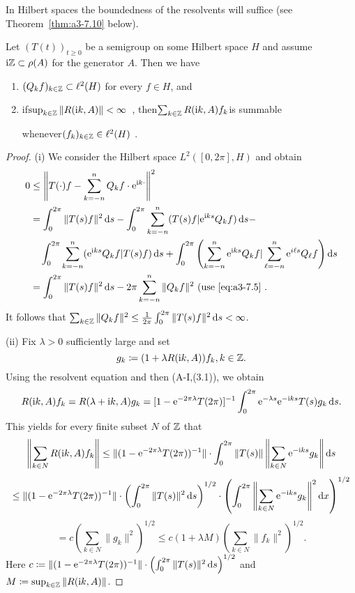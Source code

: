 In Hilbert spaces the boundedness of the resolvents will suffice (see Theorem~\ref{thm:a3-7.10} below).
\begin{lemma}\label{lem:a3-7.9}
Let $(T(t))_{t\geq 0}$ be a semigroup on some Hilbert space $H$ and assume $\mathrm{i}\mathbb{Z} \subset \rho(A)$ for the generator $A$.
Then we have
\begin{enumerate}[\upshape (i)]
\item 
$(Q_{k}f)_{k\in\mathbb{Z}} \subset \ell^{2}(H)$ for every $f \in H$, and

\item 
if\quad $\sup_{k\in\mathbb{Z}}\|R(\mathrm{i} k,A)\| < \infty$~, then\quad $\sum_{k\in\mathbb{Z}} R(\mathrm{i} k,A)f_{k}$\quad is summable 

whenever\quad $(f_{k})_{k\in\mathbb{Z}} \in \ell^{2}(H)$ .
\end{enumerate}
\end{lemma}
\begin{proof}
(i) We consider the Hilbert space $L^{2}([0,2\pi],H)$ and obtain
\begin{align*}
0 &\leq \left\|T(\cdot)f - \sum_{k=-n}^{n} Q_{k}f\cdot \mathrm{e}^{\mathrm{i} k\cdot}\right\|^{2} \\
&= \int_{0}^{2\pi} \|T(s)f\|^{2} \mathop{}\!\mathrm{d}{s} - \int_{0}^{2\pi} \sum_{k=-n}^{n} (T(s)f|\mathrm{e}^{\mathrm{i} ks}Q_{k}f) \mathop{}\!\mathrm{d}{s} - \\
&\quad \int_{0}^{2\pi} \sum_{k=-n}^{n} (\mathrm{e}^{\mathrm{i} ks}Q_{k}f|T(s)f) \mathop{}\!\mathrm{d}{s} + \int_{0}^{2\pi} \left(\sum_{k=-n}^{n} \mathrm{e}^{\mathrm{i} ks}Q_{k}f|\sum_{\ell=-n}^{n} \mathrm{e}^{i\ell s}Q_{\ell}f\right) \mathop{}\!\mathrm{d}{s} \\
&= \int_{0}^{2\pi} \|T(s)f\|^{2} \mathop{}\!\mathrm{d}{s} - 2\pi\sum_{k=-n}^{n} \|Q_{k}f\|^{2} \text{ (use \eqref{eq:a3-7.5} } .
\end{align*}
It follows that $\sum_{k\in\mathbb{Z}} \|Q_{k}f\|^{2} \leq \frac{1}{2\pi}\int_{0}^{2\pi} \|T(s)f\|^{2} \mathop{}\!\mathrm{d}{s} < \infty$.

(ii) Fix $\lambda > 0$ sufficiently large and set 
\[
g_{k}\coloneqq (1 + \lambda R(\mathrm{i} k,A))f_{k}, k \in \mathbb{Z} .
\]
Using the resolvent equation and then (A-I,(3.1)), we obtain
\[
R(\mathrm{i} k,A)f_{k} = R(\lambda + \mathrm{i} k,A)g_{k} = [1 - \mathrm{e}^{-2\pi\lambda}T(2\pi)]^{-1}\int_{0}^{2\pi} \mathrm{e}^{-\lambda s}\mathrm{e}^{-\mathrm{i} ks}T(s)g_{k} \mathop{}\!\mathrm{d}{s} .
\]
This yields for every finite subset $N$ of $\mathbb{Z}$ that
\[
\left\|\sum_{k\in N} R(\mathrm{i} k,A)f_{k}\right\| \leq \|(1 - \mathrm{e}^{-2\pi\lambda}T(2\pi))^{-1}\|\cdot\int_{0}^{2\pi} \|T(s)\| \left\|\sum_{k\in N} \mathrm{e}^{-\mathrm{i} ks}g_{k}\right\| \mathop{}\!\mathrm{d}{s}
\]
\[
\leq \|(1 - \mathrm{e}^{-2\pi\lambda}T(2\pi))^{-1}\|\cdot\left(\int_{0}^{2\pi}\|T(s)\|^{2} \mathop{}\!\mathrm{d}{s}\right)^{1/2} \cdot \left(\int_{0}^{2\pi}\left\|\sum_{k\in N} \mathrm{e}^{-\mathrm{i} ks}g_{k}\right\|^{2} \mathop{}\!\mathrm{d}{x}\right)^{1/2}
\]
\[
= c(\sum_{k\in N} \|g_{k}\|^{2})^{1/2} \leq c(1 + \lambda M)\left(\sum_{k\in N} \|f_{k}\|^{2}\right)^{1/2} .
\]
Here $c\coloneqq \|(1 - \mathrm{e}^{-2\pi\lambda}T(2\pi))^{-1}\|\cdot\left(\int_{0}^{2\pi}\|T(s)\|^{2} \mathop{}\!\mathrm{d}{s}\right)^{1/2}$ and $M\coloneqq \sup_{k\in\mathbb{Z}}\|R(\mathrm{i} k,A)\|$.
\end{proof}
